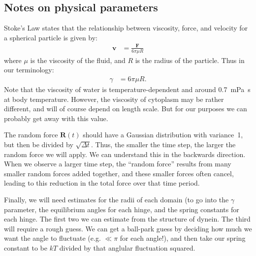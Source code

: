 \documentclass[11pt, landscape]{article}
\begin{document}
\begin{twocolumn}
\section{Notes on physical parameters}

Stoke's Law states that the relationship between viscosity, force, and
velocity for a spherical particle is given by:
\begin{align}
  \mathbf{v} &= \frac{\mathbf{F}}{6\pi \mu R}
\end{align}
where $\mu$ is the viscosity of the fluid, and $R$ is the radius of
the particle.  Thus in our terminology:
\begin{align}
  \gamma &= 6\pi \mu R.
\end{align}
Note that the viscosity of water is temperature-dependent and around
0.7~mPa~s at body temperature.  However, the viscosity of cytoplasm
may be rather different, and will of course depend on length scale.
But for our purposes we can probably get away with this value.

The random force $\mathbf{R}(t)$ should have a Gaussian distribution
with variance~1, but then be divided by $\sqrt{\Delta t}$.  Thus, the
smaller the time step, the larger the random force we will apply.  We
can understand this in the backwards direction.  When we observe a
larger time step, the ``random force'' results from many smaller
random forces added together, and these smaller forces often cancel,
leading to this reduction in the total force over that time period.

Finally, we will need estimates for the radii of each domain (to go
into the $\gamma$ parameter, the equilibrium angles for each hinge, and
the spring constants for each hinge.  The first two we can estimate
from the structure of dynein.  The third will require a rough guess.
We can get a ball-park guess by deciding how much we want the angle to
fluctuate (e.g. $\ll \pi$ for each angle!), and then take our spring
constant to be $kT$ divided by that anglular fluctuation squared.

\end{twocolumn}
\end{document}

